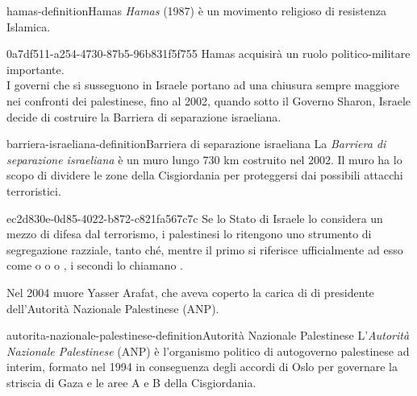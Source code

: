 \documentclass[preview]{standalone}
\begin{document}
\begin{snippetdefinition}{hamas-definition}{Hamas}
    \textit{Hamas} (1987) è un movimento religioso di resistenza Islamica.
\end{snippetdefinition}

\begin{snippet}{0a7df511-a254-4730-87b5-96b831f5f755}
    Hamas acquisirà un ruolo politico-militare importante.
    \\
    I governi che si susseguono in Israele portano ad una chiusura sempre maggiore
    nei confronti dei palestinese, fino al 2002, quando sotto il Governo
    Sharon, Israele decide di costruire la Barriera di separazione israeliana.
\end{snippet}

\begin{snippetdefinition}{barriera-israeliana-definition}{Barriera di separazione israeliana}
    La \textit{Barriera di separazione israeliana} è un muro lungo 730 km costruito nel 2002.
    Il muro ha lo scopo di dividere le zone della Cisgiordania per proteggersi
    dai possibili attacchi terroristici.
\end{snippetdefinition}

\begin{snippet}{ec2d830e-0d85-4022-b872-c821fa567c7c}
    Se lo Stato di Israele lo considera un mezzo di difesa dal terrorismo,
    i palestinesi lo ritengono uno strumento di segregazione razziale,
    tanto ché, mentre il primo si riferisce ufficialmente ad esso come
     o  o
     o ,
    i secondi lo chiamano .
    
    Nel 2004 muore Yasser Arafat, che aveva coperto la carica di
    di presidente dell'Autorità Nazionale Palestinese (ANP).
\end{snippet}

\begin{snippetdefinition}{autorita-nazionale-palestinese-definition}{Autorità Nazionale Palestinese}
    L'\textit{Autorità Nazionale Palestinese} (ANP) è
    l'organismo politico di autogoverno palestinese ad interim,
    formato nel 1994 in conseguenza degli accordi di Oslo
    per governare la striscia di Gaza e le aree A e B della Cisgiordania. 
\end{snippetdefinition}

\end{document}

